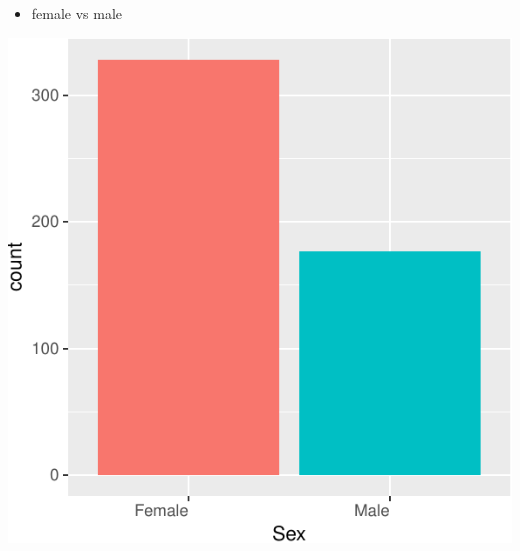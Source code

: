 \documentclass[ignorenonframetext,]{beamer}
\providecommand{\tightlist}{%
  \setlength{\itemsep}{0pt}\setlength{\parskip}{0pt}}
\begin{document}
\begin{frame}{}

\begin{itemize}
\tightlist
\item
  female vs male
\end{itemize}

\includegraphics{analisi_exp_markdown_files/figure-beamer/unnamed-chunk-4-1.pdf}

\end{frame}
\end{document}
